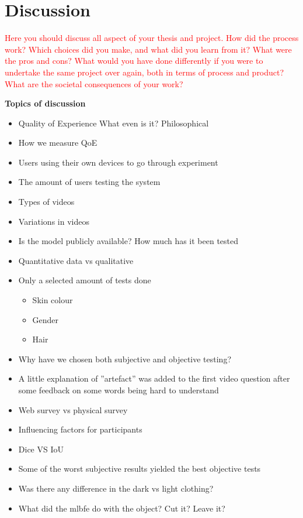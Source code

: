\chapter{Discussion}\label{cha:discussion}
%
\textcolor{red}{Here you should discuss all aspect of your thesis and project. How did the process work? Which choices did you make, and what did you learn from it? What were the pros and cons? What would you have done differently if you were to undertake the same project over again, both in terms of process and product? What are the societal consequences of your work?}

\textbf{Topics of discussion}
\begin{itemize}
    \item Quality of Experience \newline What even is it? Philosophical
    \item How we measure QoE
    \item Users using their own devices to go through experiment
    \item The amount of users testing the system
    \item Types of videos
    \item Variations in videos
    \item Is the model publicly available? How much has it been tested
    \item Quantitative data vs qualitative
    
    \item Only a selected amount of tests done
    \begin{itemize}
        \item Skin colour
        \item Gender
        \item Hair
    \end{itemize}
    \item Why have we chosen both subjective and objective testing?
    \item A little explanation of ''artefact'' was added to the first video question after some feedback on some words being hard to understand
    \item Web survey vs physical survey
    \item Influencing factors for participants
    \item Dice VS IoU
    \item Some of the worst subjective results yielded the best objective tests
    \item Was there any difference in the dark vs light clothing?
    \item What did the \acrshort{mlbfe} do with the object? Cut it? Leave it? 
    
\end{itemize}


